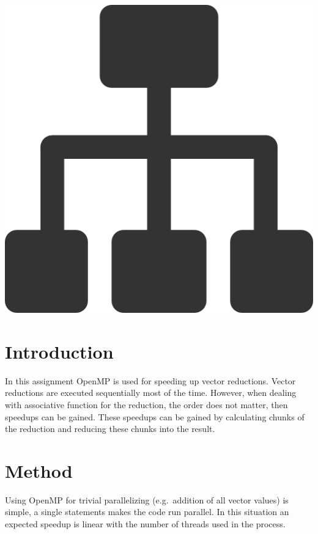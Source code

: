 \documentclass[a4paper,12px]{article}
\begin{document}
\vspace{2cm}
\begin{center}
    \includegraphics[width=(\textwidth/5*3)]{parallel_tasks}
\end{center}
\clearpage

\tableofcontents
\vspace{5mm}


\section{Introduction}

In this assignment OpenMP is used for speeding up vector reductions. Vector
reductions are executed sequentially most of the time. However, when dealing
with associative function for the reduction, the order does not matter, then
speedups can be gained. These speedups can be gained by calculating chunks of
the reduction and reducing these chunks into the result.

\section{Method}

Using OpenMP for trivial parallelizing (e.g.\ addition of all
vector values)  is simple, a single statements makes the code run parallel. In
this situation an expected speedup is linear with the number of threads used in
the process.\\
\end{document}
